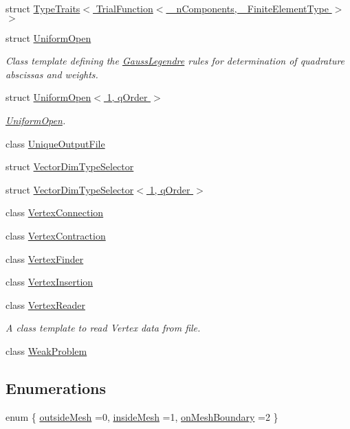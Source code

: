 \begin{DoxyCompactItemize}
\item 
struct \hyperlink{structmodel_1_1_type_traits_3_01_trial_function_3_01__n_components_00_01___finite_element_type_01_4_01_4}{Type\+Traits$<$ Trial\+Function$<$ \+\_\+n\+Components, \+\_\+\+Finite\+Element\+Type $>$ $>$}
\item 
struct \hyperlink{structmodel_1_1_uniform_open}{Uniform\+Open}
\begin{DoxyCompactList}\small\item\em Class template defining the \hyperlink{structmodel_1_1_gauss_legendre}{Gauss\+Legendre} rules for determination of quadrature abscissas and weights. \end{DoxyCompactList}\item 
struct \hyperlink{structmodel_1_1_uniform_open_3_011_00_01q_order_01_4}{Uniform\+Open$<$ 1, q\+Order $>$}
\begin{DoxyCompactList}\small\item\em \hyperlink{structmodel_1_1_uniform_open}{Uniform\+Open}. \end{DoxyCompactList}\item 
class \hyperlink{classmodel_1_1_unique_output_file}{Unique\+Output\+File}
\item 
struct \hyperlink{structmodel_1_1_vector_dim_type_selector}{Vector\+Dim\+Type\+Selector}
\item 
struct \hyperlink{structmodel_1_1_vector_dim_type_selector_3_011_00_01q_order_01_4}{Vector\+Dim\+Type\+Selector$<$ 1, q\+Order $>$}
\item 
class \hyperlink{classmodel_1_1_vertex_connection}{Vertex\+Connection}
\item 
class \hyperlink{classmodel_1_1_vertex_contraction}{Vertex\+Contraction}
\item 
class \hyperlink{classmodel_1_1_vertex_finder}{Vertex\+Finder}
\item 
class \hyperlink{classmodel_1_1_vertex_insertion}{Vertex\+Insertion}
\item 
class \hyperlink{classmodel_1_1_vertex_reader}{Vertex\+Reader}
\begin{DoxyCompactList}\small\item\em A class template to read Vertex data from file. \end{DoxyCompactList}\item 
class \hyperlink{classmodel_1_1_weak_problem}{Weak\+Problem}
\end{DoxyCompactItemize}
\subsection*{Enumerations}
\begin{DoxyCompactItemize}
\item 
enum \{ \hyperlink{namespacemodel_a6e07b69b913e52992deca3d2426f684ea53cf2f4e64b1c904af59efe0b9e330d3}{outside\+Mesh} =0, 
\hyperlink{namespacemodel_a6e07b69b913e52992deca3d2426f684ea2ba2bfb6da6dcc6d0cc3781710d81d2d}{inside\+Mesh} =1, 
\hyperlink{namespacemodel_a6e07b69b913e52992deca3d2426f684ea2574888ca704262e50b3c00dc3bbd55c}{on\+Mesh\+Boundary} =2
 \}
\end{DoxyCompactItemize}
